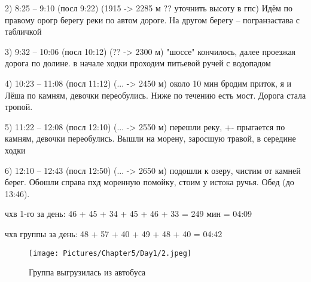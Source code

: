 2) 8:25 -- 9:10 (посл 9:22)  (1915 -> 2285 м ?? уточнить высоту в гпс) Идём по правому орогр берегу реки по автом дороге. На другом берегу -- погранзастава с табличкой

3) 9:32 -- 10:06 (посл 10:12) (?? -> 2300 м) "шоссе" кончилось, далее проезжая дорога по долине. в начале ходки проходим питьевой ручей с водопадом

4) 10:23 -- 11:08 (посл 11:12) (... -> 2450 м) около 10 мин бродим приток, я и Лёша по камням, девочки переобулись. Ниже по течению есть мост. Дорога стала тропой.

5) 11:22 -- 12:08 (посл 12:10) (... -> 2550 м) перешли реку, +- прыгается по камням, девочки переобулись. Вышли на морену, заросшую травой, в середине ходки

6) 12:10 -- 12:43 (посл 12:50) (... -> 2650 м) подошли к озеру, чистим от камней берег. Обошли справа пхд моренную помойку, стоим у истока ручья. Обед (до 13:46).

чхв 1-го за день: 46 + 45 + 34 + 45 + 46 + 33 = 249 мин = 04:09

чхв группы за день: 48 + 57 + 40 + 49 + 48 + 40 = 04:42

    \begin{figure}[hb]
        \centering
        \texttt{[image: Pictures/Chapter5/Day1/2.jpeg]}
        \caption{Группа выгрузилась из автобуса}
        \label{fig:Day1_2}
    \end{figure}

    \FloatBarrier
